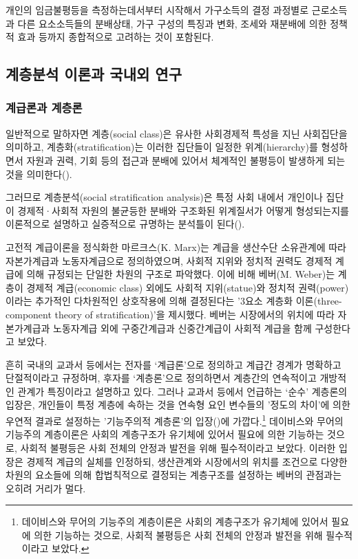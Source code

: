 \documentclass[
  letterpaper,
  DIV=11,
  numbers=noendperiod]{scrartcl}
\begin{document}
개인의 임금불평등을 측정하는데서부터 시작해서 가구소득의 결정 과정별로
근로소득과 다른 요소소득들의 분배상태, 가구 구성의 특징과 변화, 조세와
재분배에 의한 정책적 효과 등까지 종합적으로 고려하는 것이 포함된다.

\subsection{계층분석 이론과 국내외
연구}\label{uxacc4uxce35uxbd84uxc11d-uxc774uxb860uxacfc-uxad6duxb0b4uxc678-uxc5f0uxad6c}

\subsubsection{계급론과
계층론}\label{uxacc4uxae09uxb860uxacfc-uxacc4uxce35uxb860}

일반적으로 말하자면 계층(social class)은 유사한 사회경제적 특성을 지닌
사회집단을 의미하고, 계층화(stratification)는 이러한 집단들이 일정한
위계(hierarchy)를 형성하면서 자원과 권력, 기회 등의 접근과 분배에 있어서
체계적인 불평등이 발생하게 되는 것을
의미한다().

그러므로 계층분석(social stratification analysis)은 특정 사회 내에서
개인이나 집단이 경제적·사회적 자원의 불균등한 분배와 구조화된 위계질서가
어떻게 형성되는지를 이론적으로 설명하고 실증적으로 규명하는 분석틀이
된다().

고전적 계급이론을 정식화한 마르크스(K. Marx)는 계급을 생산수단
소유관계에 따라 자본가계급과 노동자계급으로 정의하였으며, 사회적 지위와
정치적 권력도 경제적 계급에 의해 규정되는 단일한 차원의 구조로 파악했다.
이에 비해 베버(M. Weber)는 계층이 경제적 계급(economic class) 외에도
사회적 지위(statue)와 정치적 권력(power)이라는 추가적인 다차원적인
상호작용에 의해 결정된다는 '3요소 계층화 이론(three-component theory of
stratification)'을 제시했다. 베버는 시장에서의 위치에 따라 자본가계급과
노동자계급 외에 구중간계급과 신중간계급이 사회적 계급을 함께 구성한다고
보았다.

흔히 국내의 교과서 등에서는 전자를 `계급론'으로 정의하고 계급간 경계가
명확하고 단절적이라고 규정하며, 후자를 `계층론'으로 정의하면서 계층간의
연속적이고 개방적인 관계가 특징이라고 설명하고 있다. 그러나 교과서
등에서 언급하는 `순수' 계층론의 입장은, 개인들이 특정 계층에 속하는 것을
연속형 요인 변수들의 '정도의 차이'에 의한 우연적 결과로 설정하는
'기능주의적 계층론'의 입장()에 가깝다.\footnote{데이비스와 무어의 기능주의 계층이론은 사회의
  계층구조가 유기체에 있어서 필요에 의한 기능하는 것으로, 사회적
  불평등은 사회 전체의 안정과 발전을 위해 필수적이라고 보았다.}
데이비스와 무어의 기능주의 계층이론은 사회의 계층구조가 유기체에 있어서
필요에 의한 기능하는 것으로, 사회적 불평등은 사회 전체의 안정과 발전을
위해 필수적이라고 보았다. 이러한 입장은 경제적 계급의 실체를 인정하되,
생산관계와 시장에서의 위치를 조건으로 다양한 차원의 요소들에 의해
합법칙적으로 결정되는 계층구조를 설정하는 베버의 관점과는 오히려 거리가
멀다.
\end{document}
